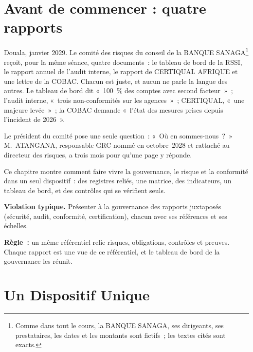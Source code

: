 \bigskip

\section*{Avant de commencer : quatre rapports}

Douala, janvier 2029. Le comité des risques du conseil de la BANQUE
SANAGA\footnote{Comme dans tout le cours, la BANQUE SANAGA, ses dirigeants,
ses prestataires, les dates et les montants sont fictifs~; les textes cités
sont exacts.} reçoit, pour la même séance, quatre documents~: le tableau de
bord de la RSSI, le rapport annuel de l'audit interne, le rapport de
CERTIQUAL AFRIQUE et une lettre de la COBAC. Chacun est juste, et aucun ne
parle la langue des autres. Le tableau de bord dit «~100~\% des comptes avec
second facteur~»~; l'audit interne, «~trois non-conformités sur les
agences~»~; CERTIQUAL, «~une majeure levée~»~; la COBAC demande «~l'état des
mesures prises depuis l'incident de 2026~».

Le président du comité pose une seule question~: «~Où en sommes-nous~?~»
M.~ATANGANA, responsable GRC nommé en octobre~2028 et rattaché au directeur
des risques, a trois mois pour qu'une page y réponde.

\medskip

Ce chapitre montre comment faire vivre la gouvernance, le risque et la
conformité dans un seul dispositif~: des registres reliés, une matrice, des
indicateurs, un tableau de bord, et des contrôles qui se vérifient seuls.

\begin{boxalert}
\textbf{Violation typique.} Présenter à la gouvernance des rapports
juxtaposés (sécurité, audit, conformité, certification), chacun avec ses
références et ses échelles.

\smallskip
\textbf{Règle~:} un même référentiel relie risques, obligations, contrôles
et preuves. Chaque rapport est une vue de ce référentiel, et le tableau de
bord de la gouvernance les réunit.
\end{boxalert}

\separateur

\section{Un Dispositif Unique}
\label{sec:c13-dispositif}

